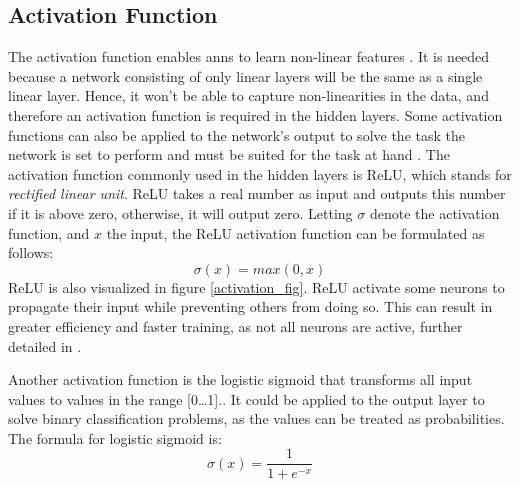         
    \subsection{Activation Function} \label{activation function}
        The activation function enables \gls{ann}s to learn non-linear features \cite{razavi2021deep_exp_per}. It is needed because a network consisting of only linear layers will be the same as a single linear layer\cite{razavi2021deep_exp_per}. Hence, it won't be able to capture non-linearities in the data, and therefore an activation function is required in the hidden layers. Some activation functions can also be applied to the network's output to solve the task the network is set to perform and must be suited for the task at hand \cite{Goodfellow-et-al-2016}. The activation function commonly used in the hidden layers is ReLU, which stands for \textit{rectified linear unit}\cite{sharma2019new_activation_func}. ReLU takes a real number as input and outputs this number if it is above zero,  otherwise, it will output zero. Letting $\sigma$ denote the activation function, and $x$ the input, the ReLU activation function can be formulated as follows:
            \begin{equation} \label{relu_eq}
                \sigma(x) = max(0,x)
            \end{equation}
        ReLU is also visualized in figure \ref{activation_fig}. ReLU activate some neurons to propagate their input while preventing others from doing so. This can result in greater efficiency and faster training, as not all neurons are active, further detailed in \citeauthor{sharma2019new_activation_func}\cite{sharma2019new_activation_func}. 
        
        Another activation function is the logistic sigmoid that transforms all input values to values in the range [0…1].\cite{sharma2019new_activation_func}. It could be applied to the output layer to solve binary classification problems, as the values can be treated as probabilities. The formula for logistic sigmoid is:
            \begin{equation} \label{sigmoid_eq}
                \sigma(x) = \dfrac{1}{1 + e^{-x}} 
            \end{equation}
            
